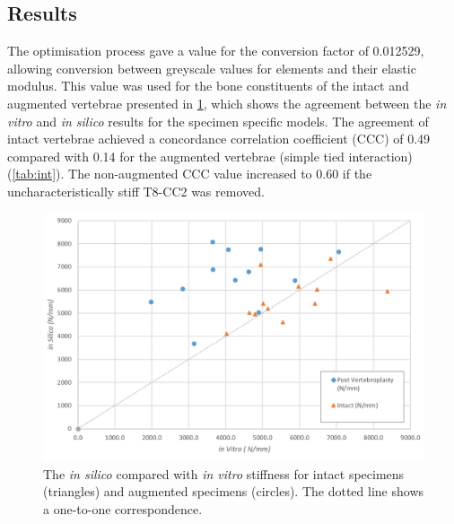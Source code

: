 \subsection{Results} \label{bov:results}

The optimisation process gave a value for the conversion factor of 0.012529,
allowing conversion between greyscale values for elements and their elastic
modulus. This value was used for the bone constituents of the intact and
augmented vertebrae presented in \cref{fig:compvexpscatter}, which shows the
agreement between the \textit{in vitro} and \textit{in silico} results for the
specimen specific models. The agreement of intact vertebrae achieved a
concordance correlation coefficient (CCC) of 0.49 compared with 0.14 for the
augmented vertebrae (simple tied interaction) (\cref{tab:int}).  The
non-augmented CCC value increased to 0.60 if the uncharacteristically stiff
T8-CC2 was removed.

\begin{figure}[ht]
\centering
\includegraphics[width=\textwidth]{images/exp_vs_comp_both.png}
\caption{The \textit{in silico} compared with \textit{in vitro} stiffness for intact specimens (triangles) and augmented specimens (circles). The dotted line shows a one-to-one correspondence.}
\label{fig:compvexpscatter}
\end{figure}

